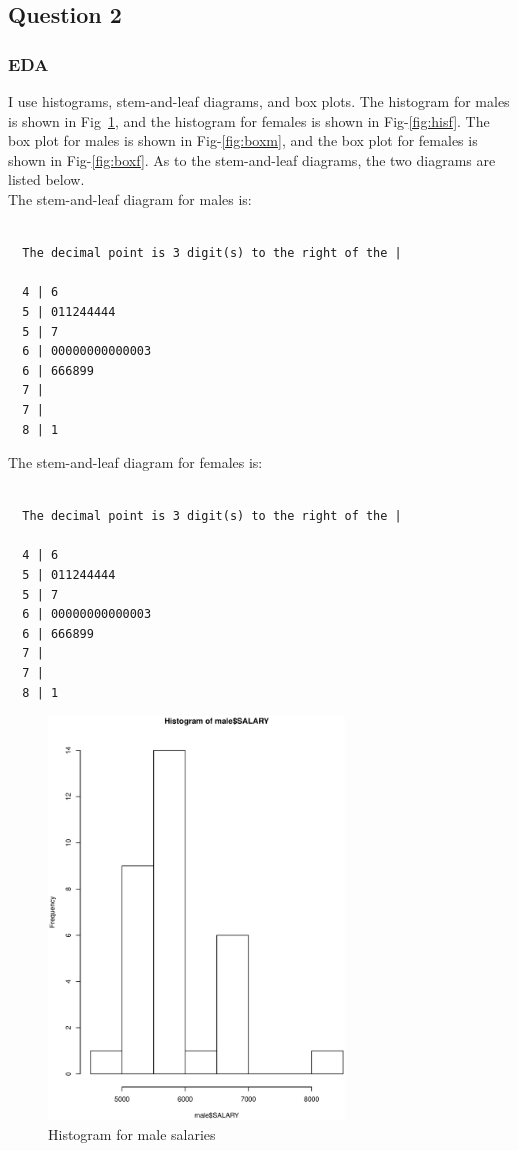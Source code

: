 \documentclass{article}
\begin{document}
\subsection{Question 2}

\subsubsection{EDA}
I use histograms, stem-and-leaf diagrams, and box plots. The histogram
for males is shown in Fig~\ref{fig:histm}, and the histogram for
females is shown in Fig-\ref{fig:hisf}. The box plot for males is
shown in Fig-\ref{fig:boxm}, and the box plot for females is shown in
Fig-\ref{fig:boxf}. As to the stem-and-leaf diagrams, the two diagrams
are listed below.\\

The stem-and-leaf diagram for males is:
\begin{verbatim}

  The decimal point is 3 digit(s) to the right of the |

  4 | 6
  5 | 011244444
  5 | 7
  6 | 00000000000003
  6 | 666899
  7 | 
  7 | 
  8 | 1

\end{verbatim}

The stem-and-leaf diagram for females is:
\begin{verbatim}

  The decimal point is 3 digit(s) to the right of the |

  4 | 6
  5 | 011244444
  5 | 7
  6 | 00000000000003
  6 | 666899
  7 | 
  7 | 
  8 | 1

\end{verbatim}

\begin{figure}[ht!]
  \centering
  \includegraphics[width=0.7\textwidth]{hist_male}
  \caption{Histogram for male salaries \label{fig:histm}}
\end{figure}
\end{document}
